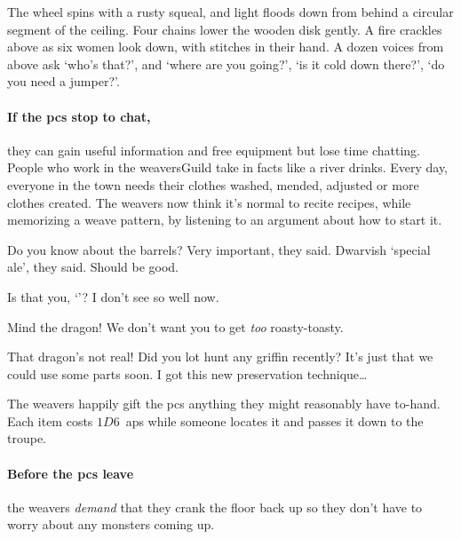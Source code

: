 \begin{multicols}{2}
\begin{boxtext}
  The wheel spins with a rusty squeal, and light floods down from behind a circular segment of the ceiling.
  Four chains lower the wooden disk gently.
  A fire crackles above as six women look down, with stitches in their hand.
  A dozen voices from above ask `who's that?', and `where are you going?', `is it cold down there?', `do you need a jumper?'.
\end{boxtext}

\paragraph{If the \glspl{pc} stop to chat,}
they can gain useful information and free \gls{equipment} but lose time chatting.
People who work in the \gls{weaversGuild} take in facts like a river drinks.
Every day, everyone in the town needs their clothes washed, mended, adjusted or more clothes created.
The \glspl{weaver} now think it's normal to recite recipes, while memorizing a weave pattern, by listening to an argument about how to start it.

\begin{speechtext}

  Do you know about the barrels?
  Very important, they said.
  Dwarvish `special ale', they said.
  Should be good.

  {\small
    Is that you, `\composeHumanName'?
    I don't see so well now.
  }

  \vspace{-.5em}
  {\large
    Mind the dragon!
    We don't want you to get \emph{too} roasty-toasty.
  }

  That dragon's not real!
  Did you lot hunt any \gls{griffin} recently?
  It's just that we could use some parts soon.
  I got this new preservation technique\ldots

  \vspace{-.3em}
\end{speechtext}

The \glspl{weaver} happily gift the \glspl{pc} anything they might reasonably have to-hand.
Each item costs $1D6$~\glspl{ap} while someone locates it and passes it down to the troupe.

\paragraph{Before the \glspl{pc} leave}
the \glspl{weaver} \emph{demand} that they crank the floor back up so they don't have to worry about any \glspl{monster} coming up.


\end{multicols}
